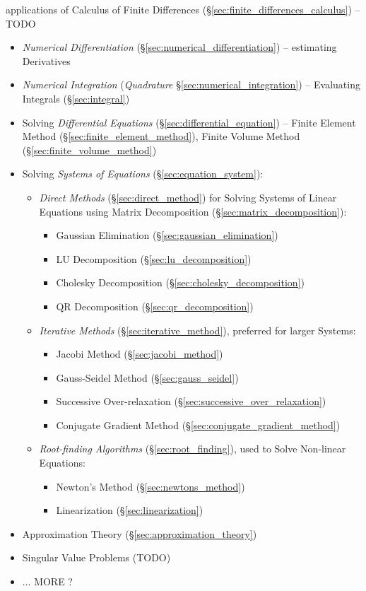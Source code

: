 applications of Calculus of Finite Differences
(\S\ref{sec:finite_differences_calculus}) --TODO

\begin{itemize}
  \item \emph{Numerical Differentiation} (\S\ref{sec:numerical_differentiation})
    -- estimating Derivatives
  \item \emph{Numerical Integration} (\emph{Quadrature}
    \S\ref{sec:numerical_integration}) -- Evaluating Integrals
    (\S\ref{sec:integral})
  \item Solving \emph{Differential Equations}
    (\S\ref{sec:differential_equation}) -- Finite Element Method
    (\S\ref{sec:finite_element_method}), Finite Volume Method
    (\S\ref{sec:finite_volume_method})
  \item Solving \emph{Systems of Equations} (\S\ref{sec:equation_system}):
    \begin{itemize}
      \item \emph{Direct Methods} (\S\ref{sec:direct_method}) for Solving
        Systems of Linear Equations using Matrix Decomposition
        (\S\ref{sec:matrix_decomposition}):
        \begin{itemize}
          \item Gaussian Elimination (\S\ref{sec:gaussian_elimination})
          \item LU Decomposition (\S\ref{sec:lu_decomposition})
          \item Cholesky Decomposition (\S\ref{sec:cholesky_decomposition})
          \item QR Decomposition (\S\ref{sec:qr_decomposition})
        \end{itemize}
      \item \emph{Iterative Methods} (\S\ref{sec:iterative_method}), preferred
        for larger Systems:
        \begin{itemize}
          \item Jacobi Method (\S\ref{sec:jacobi_method})
          \item Gauss-Seidel Method (\S\ref{sec:gauss_seidel})
          \item Successive Over-relaxation
            (\S\ref{sec:successive_over_relaxation})
          \item Conjugate Gradient Method
            (\S\ref{sec:conjugate_gradient_method})
        \end{itemize}
      \item \emph{Root-finding Algorithms} (\S\ref{sec:root_finding}), used to
        Solve Non-linear Equations:
        \begin{itemize}
          \item Newton's Method (\S\ref{sec:newtons_method})
          \item Linearization (\S\ref{sec:linearization})
        \end{itemize}
    \end{itemize}
  \item Approximation Theory (\S\ref{sec:approximation_theory})
  \item Singular Value Problems (TODO)
  \item ... MORE ?
\end{itemize}

